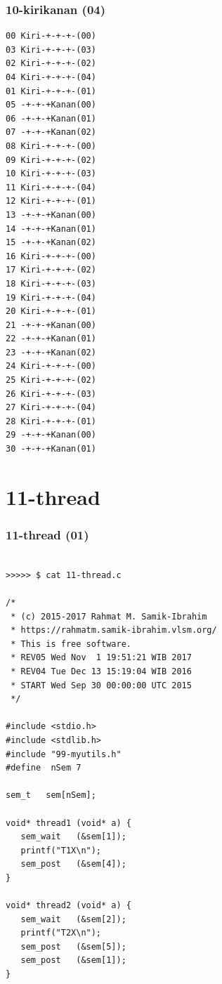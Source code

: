 \documentclass[xcolor=table, notheorems, hyperref={pdfpagelabels=false}]{beamer}
\begin{document}
\begin{frame}[fragile]
\frametitle{10-kirikanan (04)}
\begin{lstlisting}[basicstyle=\ttfamily\tiny]
00 Kiri-+-+-+-(00)
03 Kiri-+-+-+-(03)
02 Kiri-+-+-+-(02)
04 Kiri-+-+-+-(04)
01 Kiri-+-+-+-(01)
05 -+-+-+Kanan(00)
06 -+-+-+Kanan(01)
07 -+-+-+Kanan(02)
08 Kiri-+-+-+-(00)
09 Kiri-+-+-+-(02)
10 Kiri-+-+-+-(03)
11 Kiri-+-+-+-(04)
12 Kiri-+-+-+-(01)
13 -+-+-+Kanan(00)
14 -+-+-+Kanan(01)
15 -+-+-+Kanan(02)
16 Kiri-+-+-+-(00)
17 Kiri-+-+-+-(02)
18 Kiri-+-+-+-(03)
19 Kiri-+-+-+-(04)
20 Kiri-+-+-+-(01)
21 -+-+-+Kanan(00)
22 -+-+-+Kanan(01)
23 -+-+-+Kanan(02)
24 Kiri-+-+-+-(00)
25 Kiri-+-+-+-(02)
26 Kiri-+-+-+-(03)
27 Kiri-+-+-+-(04)
28 Kiri-+-+-+-(01)
29 -+-+-+Kanan(00)
30 -+-+-+Kanan(01)

\end{lstlisting}
\end{frame}

\section{11-thread}
\begin{frame}[fragile]
\frametitle{11-thread (01)}
\begin{lstlisting}[basicstyle=\ttfamily\tiny]

>>>>> $ cat 11-thread.c

/*
 * (c) 2015-2017 Rahmat M. Samik-Ibrahim
 * https://rahmatm.samik-ibrahim.vlsm.org/
 * This is free software.
 * REV05 Wed Nov  1 19:51:21 WIB 2017
 * REV04 Tue Dec 13 15:19:04 WIB 2016
 * START Wed Sep 30 00:00:00 UTC 2015
 */

#include <stdio.h>
#include <stdlib.h>
#include "99-myutils.h"
#define  nSem 7

sem_t	sem[nSem];

void* thread1 (void* a) {
   sem_wait   (&sem[1]);
   printf("T1X\n");
   sem_post   (&sem[4]);
}

void* thread2 (void* a) {
   sem_wait   (&sem[2]);
   printf("T2X\n");
   sem_post   (&sem[5]);
   sem_post   (&sem[1]);
}

\end{lstlisting}
\end{frame}
\end{document}
